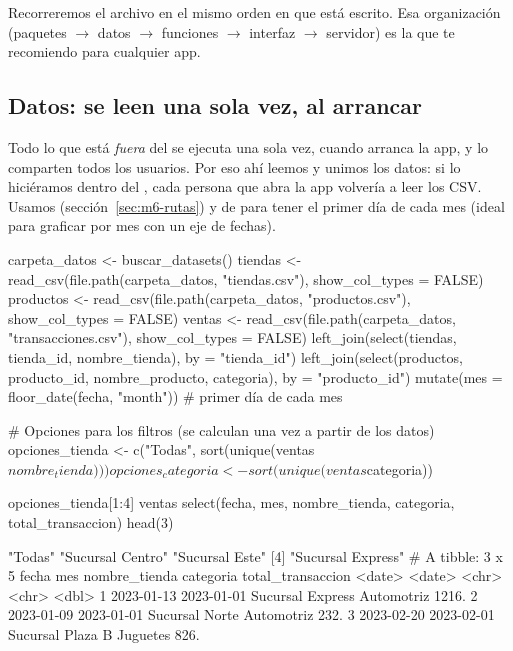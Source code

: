 Recorreremos el archivo en el mismo orden en que está escrito. Esa
organización (paquetes $\rightarrow$ datos $\rightarrow$ funciones
$\rightarrow$ interfaz $\rightarrow$ servidor) es la que te recomiendo para
cualquier app.

\subsection{Datos: se leen una sola vez, al arrancar}

Todo lo que está \emph{fuera} del  se ejecuta una sola vez,
cuando arranca la app, y lo comparten todos los usuarios. Por eso ahí leemos
y unimos los datos: si lo hiciéramos dentro del , cada
persona que abra la app volvería a leer los CSV. Usamos
 (sección~\ref{sec:m6-rutas}) y
 de  para tener el primer día de
cada mes (ideal para graficar por mes con un eje de fechas).

\begin{rcode}
carpeta_datos <- buscar_datasets()
tiendas   <- read_csv(file.path(carpeta_datos, "tiendas.csv"),
                      show_col_types = FALSE)
productos <- read_csv(file.path(carpeta_datos, "productos.csv"),
                      show_col_types = FALSE)
ventas <- read_csv(file.path(carpeta_datos, "transacciones.csv"),
                   show_col_types = FALSE) %
  left_join(select(tiendas, tienda_id, nombre_tienda), by = "tienda_id") %
  left_join(select(productos, producto_id, nombre_producto, categoria),
            by = "producto_id") %
  mutate(mes = floor_date(fecha, "month"))   # primer día de cada mes

# Opciones para los filtros (se calculan una vez a partir de los datos)
opciones_tienda    <- c("Todas", sort(unique(ventas$nombre_tienda)))
opciones_categoria <- sort(unique(ventas$categoria))

opciones_tienda[1:4]
ventas %
  select(fecha, mes, nombre_tienda, categoria, total_transaccion) %
  head(3)
\end{rcode}
\begin{rsalida}
[1] "Todas"            "Sucursal Centro"  "Sucursal Este"   
[4] "Sucursal Express"
# A tibble: 3 x 5
  fecha      mes        nombre_tienda    categoria  total_transaccion
  <date>     <date>     <chr>            <chr>                  <dbl>
1 2023-01-13 2023-01-01 Sucursal Express Automotriz             1216.
2 2023-01-09 2023-01-01 Sucursal Norte   Automotriz              232.
3 2023-02-20 2023-02-01 Sucursal Plaza B Juguetes                826.
\end{rsalida}


